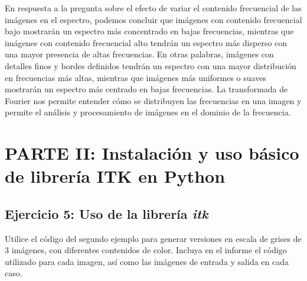 \documentclass{article}
\begin{document}
En respuesta a la pregunta sobre el efecto de variar el contenido frecuencial de las imágenes en el espectro, podemos concluir que imágenes con contenido frecuencial bajo mostrarán un espectro más concentrado en bajas frecuencias, mientras que imágenes con contenido frecuencial alto tendrán un espectro más disperso con una mayor presencia de altas frecuencias. En otras palabras, imágenes con detalles finos y bordes definidos tendrán un espectro con una mayor distribución en frecuencias más altas, mientras que imágenes más uniformes o suaves mostrarán un espectro más centrado en bajas frecuencias. La transformada de Fourier nos permite entender cómo se distribuyen las frecuencias en una imagen y permite el análisis y procesamiento de imágenes en el dominio de la frecuencia.

\section*{PARTE II: Instalación y uso básico de librería ITK en Python}

\subsection*{Ejercicio 5: Uso de la librería \textit{itk}}

Utilice el código del segundo ejemplo para generar versiones en escala de grises de 3 imágenes, con diferentes contenidos de color. Incluya en el informe el código utilizado para cada imagen, así como las imágenes de entrada y salida en cada caso.
\end{document}
